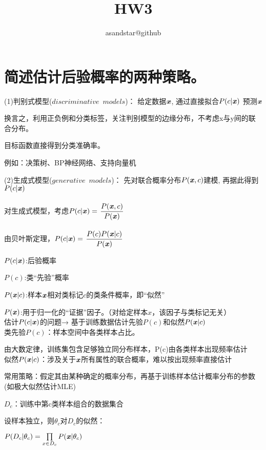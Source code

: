 \documentclass[UTF8]{ctexart}
\author{asandstar@github}
\title{HW3}
\begin{document}
\maketitle
\section{简述估计后验概率的两种策略。}
 (1)判别式模型($discriminative$\, $models$)：
给定数据$\textbf{\emph{x}}$,
通过直接拟合$P(c|\textbf{\emph{x}})$
预测$\textbf{\emph{x}}$

换言之，利用正负例和分类标签，关注判别模型的边缘分布，不考虑x与y间的联合分布。

目标函数直接得到分类准确率。

例如：决策树、BP神经网络、支持向量机

(2)生成式模型($generative$\, $models$)：
先对联合概率分布$P(\textbf{\emph{x}},c)$建模,
再据此得到$P(c|\textbf{\emph{x}})$
\\
\\
对生成式模型，考虑$P(c|\textbf{\emph{x}})=$
$\displaystyle{\frac{P(\textbf{\emph{x}},c)}{P(\textbf{\emph{x}})}}$
\\
\\
由贝叶斯定理，$P(c|\textbf{\emph{x}})=$
$\displaystyle{\frac{P(c)P(\textbf{\emph{x}}|c)}{P(\textbf{\emph{x}})}}$

$P(c|\textbf{\emph{x}})$:后验概率

$P(c)$:类“先验”概率

$P(\textbf{\emph{x}}|c)$:样本$\textbf{\emph{x}}$相对类标记$c$的类条件概率，即“似然”

$P(\textbf{\emph{x}})$:用于归一化的“证据”因子。（对给定样本$x$，该因子与类标记无关）
\\
估计$P(c|\textbf{\emph{x}})$的问题→
基于训练数据估计先验$P(c)$和似然$P(\textbf{\emph{x}}|c)$
\\
类先验$P(c)$：样本空间中各类样本占比。

由大数定律，训练集包含足够独立同分布样本，P(c)由各类样本出现频率估计
\\
似然$P(\textbf{\emph{x}}|c)$：涉及关于$\textbf{\emph{x}}$所有属性的联合概率，难以按出现频率直接估计

常用策略：假定其由某种确定的概率分布，再基于训练样本估计概率分布的参数(如极大似然估计MLE)

$D_c$：训练中第c类样本组合的数据集合

设样本独立，则$\theta _c$对$D_c$的似然：
\begin{center}
  $P(D_c|\theta _c)=\prod \limits_{x \in D_c}P(\textbf{\emph{x}}|\theta _c)$
\end{center}
\end{document}
